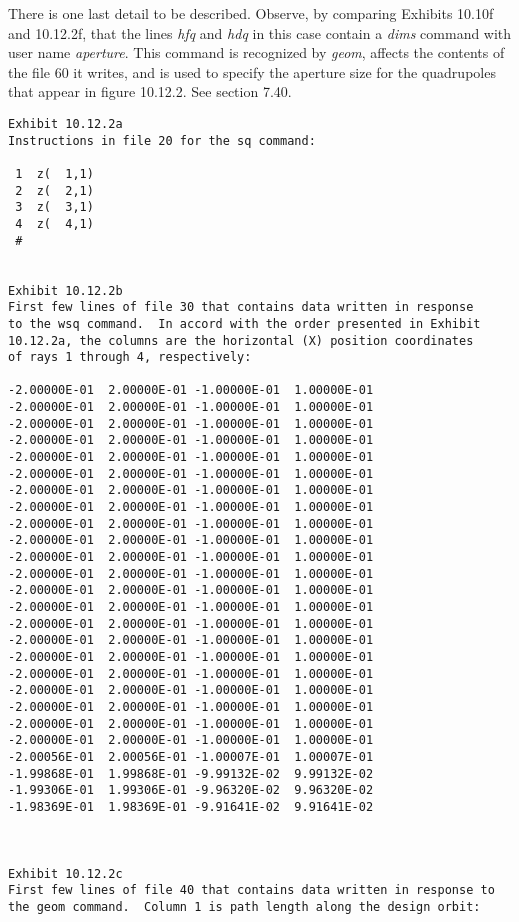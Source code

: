 There is one last detail to be described.  Observe, by comparing Exhibits
10.10f and 10.12.2f, that the lines {\em hfq} and {\em hdq} in this case contain a
{\em dims} command with user name {\em aperture}.  This command is recognized by {\em geom},
affects the contents of the file 60 it writes, and is used to specify the aperture
size for the quadrupoles that appear in figure 10.12.2.  See section 7.40.
\begin{footnotesize}
\begin{verbatim}
Exhibit 10.12.2a
Instructions in file 20 for the sq command:

 1  z(  1,1)
 2  z(  2,1)
 3  z(  3,1)
 4  z(  4,1)
 #


Exhibit 10.12.2b
First few lines of file 30 that contains data written in response
to the wsq command.  In accord with the order presented in Exhibit
10.12.2a, the columns are the horizontal (X) position coordinates
of rays 1 through 4, respectively:

-2.00000E-01  2.00000E-01 -1.00000E-01  1.00000E-01
-2.00000E-01  2.00000E-01 -1.00000E-01  1.00000E-01
-2.00000E-01  2.00000E-01 -1.00000E-01  1.00000E-01
-2.00000E-01  2.00000E-01 -1.00000E-01  1.00000E-01
-2.00000E-01  2.00000E-01 -1.00000E-01  1.00000E-01
-2.00000E-01  2.00000E-01 -1.00000E-01  1.00000E-01
-2.00000E-01  2.00000E-01 -1.00000E-01  1.00000E-01
-2.00000E-01  2.00000E-01 -1.00000E-01  1.00000E-01
-2.00000E-01  2.00000E-01 -1.00000E-01  1.00000E-01
-2.00000E-01  2.00000E-01 -1.00000E-01  1.00000E-01
-2.00000E-01  2.00000E-01 -1.00000E-01  1.00000E-01
-2.00000E-01  2.00000E-01 -1.00000E-01  1.00000E-01
-2.00000E-01  2.00000E-01 -1.00000E-01  1.00000E-01
-2.00000E-01  2.00000E-01 -1.00000E-01  1.00000E-01
-2.00000E-01  2.00000E-01 -1.00000E-01  1.00000E-01
-2.00000E-01  2.00000E-01 -1.00000E-01  1.00000E-01
-2.00000E-01  2.00000E-01 -1.00000E-01  1.00000E-01
-2.00000E-01  2.00000E-01 -1.00000E-01  1.00000E-01
-2.00000E-01  2.00000E-01 -1.00000E-01  1.00000E-01
-2.00000E-01  2.00000E-01 -1.00000E-01  1.00000E-01
-2.00000E-01  2.00000E-01 -1.00000E-01  1.00000E-01
-2.00000E-01  2.00000E-01 -1.00000E-01  1.00000E-01
-2.00056E-01  2.00056E-01 -1.00007E-01  1.00007E-01
-1.99868E-01  1.99868E-01 -9.99132E-02  9.99132E-02
-1.99306E-01  1.99306E-01 -9.96320E-02  9.96320E-02
-1.98369E-01  1.98369E-01 -9.91641E-02  9.91641E-02



Exhibit 10.12.2c
First few lines of file 40 that contains data written in response to
the geom command.  Column 1 is path length along the design orbit:


\end{verbatim}
\end{footnotesize}
